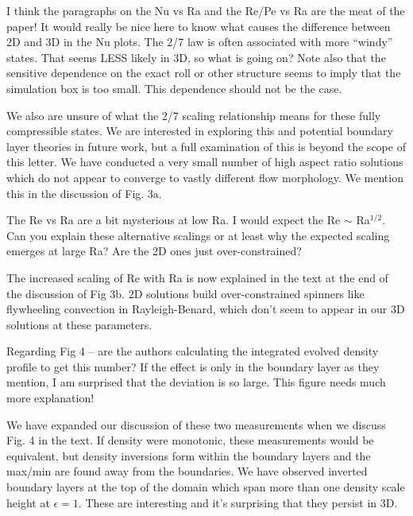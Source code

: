 \documentclass[aps, 11pt, singlecolumn]{revtex4-1} %
\begin{document}
\begin{singlespace}
\begin{myquotation}
I think the paragraphs on the Nu vs Ra and the Re/Pe vs Ra are the
meat of the paper! It would really be nice here to know what causes
the difference between 2D and 3D in the Nu plots. The 2/7 law is often
associated with more “windy” states. That seems LESS likely in 3D, so
what is going on? Note also that the sensitive dependence on the exact
roll or other structure seems to imply that the simulation box is too
small. This dependence should not be the case.
\end{myquotation}
We also are unsure of what the 2/7 scaling relationship means for these
fully compressible states.  We are interested in exploring this and potential
boundary layer theories in future work, but a full examination of this
is beyond the scope of this letter.
We have conducted a very small number of high aspect ratio solutions which
do not appear to converge to vastly different flow morphology.  We mention this
in the discussion of Fig. 3a.


\begin{myquotation}
The Re vs Ra are a bit mysterious at low Ra. I would expect the Re $\sim$
Ra$^{1/2}$. Can you explain these alternative scalings or at least why the
expected scaling emerges at large Ra? Are the 2D ones just
over-constrained?
\end{myquotation}
The increased scaling of Re with Ra is now explained in the text at the end
of the discussion of Fig 3b.  2D solutions build over-constrained spinners
like flywheeling convection in Rayleigh-Benard, which don't seem to appear
in our 3D solutions at these parameters.

\begin{myquotation}
Regarding Fig 4 -- are the authors calculating the integrated evolved
density profile to get this number? If the effect is only in the
boundary layer as they mention, I am surprised that the deviation is
so large. This figure needs much more explanation!
\end{myquotation}
We have expanded our discussion of these two measurements when we discuss Fig. 4 in the text.
If density were monotonic, these measurements would be equivalent, but density
inversions form within the boundary layers and the max/min are found away from the boundaries.
We have observed inverted boundary layers at the top of
the domain which span more than one density scale height at $\epsilon = 1$.
These are interesting and it's surprising that they persist in 3D.

~\newline


\end{singlespace}
\end{document}
